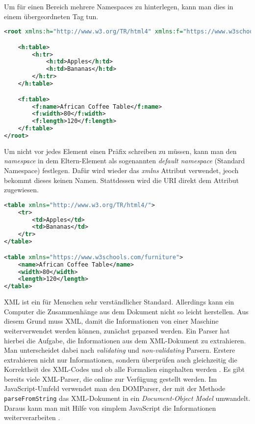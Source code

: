 Um für einen Bereich mehrere Namespaces zu hinterlegen, kann man dies in einem übergeordneten Tag tun. \\

\begin{lstlisting}[title=Verwendung von \textit{namespaces} Möglichkeit 2, language=XML, morekeywords={h:table, xmlns:h, h:tr, h:td, f:table, xmlns:f, f:name, f:width, f:length, root}]
<root xmlns:h="http://www.w3.org/TR/html4" xmlns:f="https://www.w3schools.com/furniture">

	<h:table>
		<h:tr>
			<h:td>Apples</h:td>
			<h:td>Bananas</h:td>
		</h:tr>
	</h:table>

	<f:table>
		<f:name>African Coffee Table</f:name>
		<f:width>80</f:width>
		<f:length>120</f:length>
	</f:table>
</root>
\end{lstlisting}

Um nicht vor jedes Element einen Präfix schreiben zu müssen, kann man den \textit{namespace} in dem Eltern-Element als sogenannten \textit{default namespace} (Standard Namespace) festlegen. Dafür wird wieder das \textit{xmlns} Attribut verwendet, jeoch bekommt dieses keinen Namen. Stattdessen wird die \ac{URI} direkt dem Attribut zugewiesen. \\

\begin{lstlisting}[title=Verwendung von \textit{namespaces} Möglichkeit 3, language=XML, morekeywords={h:table, xmlns, tr, td, table, xmlns, name, width, length}]
<table xmlns="http://www.w3.org/TR/html4/">
	<tr>
		<td>Apples</td>
		<td>Bananas</td>
	</tr>
</table> 

<table xmlns="https://www.w3schools.com/furniture">
	<name>African Coffee Table</name>
	<width>80</width>
	<length>120</length>
</table>
\end{lstlisting}

XML ist ein für Menschen sehr verständlicher Standard. Allerdings kann ein Computer die Zusammenhänge aus dem Dokument nicht so leicht herstellen. Aus diesem Grund muss \ac{XML}, damit die Informationen von einer Maschine weiterverwendet werden können, zunächst geparsed werden. Ein Parser hat hierbei die Aufgabe, die Informationen aus dem \ac{XML}-Dokument zu extrahieren. Man unterscheidet dabei nach \textit{validating} und \textit{non-validating} Parsern. Erstere extrahieren nicht nur Informationen, sondern überprüfen auch gleichzeitig die Korrektheit des \ac{XML}-Codes und ob alle Formalien eingehalten werden \cite{pars}. Es gibt bereits viele \ac{XML}-Parser, die online zur Verfügung gestellt werden. Im JavaScript-Umfeld verwendet man den DOMParser, der mit der Methode \texttt{parseFromString} das \ac{XML}-Dokument in ein \textit{Document-Object Model} umwandelt. Daraus kann man mit Hilfe von simplem JavaScript die Informationen weiterverarbeiten \cite{w3pars}. \\

